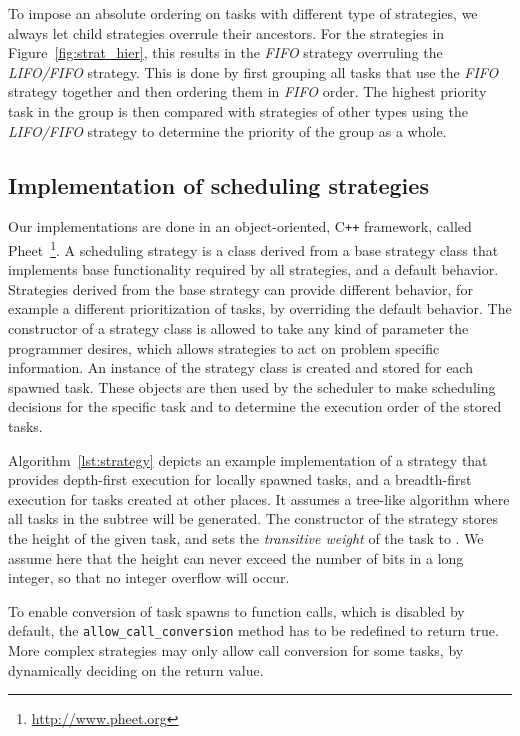 \documentclass[a4paper,11pt]{article}
\begin{document}
To impose an absolute ordering on tasks with different type of
strategies, we always let child strategies overrule their
ancestors. For the strategies in Figure~\ref{fig:strat_hier}, this
results in the \emph{FIFO} strategy overruling the \emph{LIFO/FIFO}
strategy. This is done by first grouping all tasks that use the
\emph{FIFO} strategy together and then ordering them in \emph{FIFO}
order. The highest priority task in the group is then compared with
strategies of other types using the \emph{LIFO/FIFO} strategy to
determine the priority of the group as a whole.

\subsection{Implementation of scheduling strategies}

Our implementations are done in an object-oriented, C\verb!++!
framework, called
Pheet~\cite{mtaap13,ppopp13}\footnote{\url{http://www.pheet.org}}. A
scheduling strategy is a class derived from a base strategy class that
implements base functionality required by all strategies, and a
default behavior. Strategies derived from the base strategy can
provide different behavior, for example a different prioritization of
tasks, by overriding the default behavior. The constructor of a
strategy class is allowed to take any kind of parameter the programmer
desires, which allows strategies to act on problem specific
information.  An instance of the strategy class is created and stored
for each spawned task. These objects are then used by the scheduler to
make scheduling decisions for the specific task and to determine the
execution order of the stored tasks.

Algorithm~\ref{lst:strategy} depicts an example implementation of a
strategy that provides depth-first execution for locally spawned
tasks, and a breadth-first execution for tasks created at other
places. It assumes a tree-like algorithm where all tasks in the
subtree will be generated.  The constructor of the strategy stores the
height  of the given task, and sets the \emph{transitive weight} of
the task to .  We assume here that the height can never exceed
the number of bits in a long integer, so that no integer overflow will
occur.

To enable conversion of task spawns to function calls, which is
disabled by default, the \texttt{allow\_call\_conversion} method has
to be redefined to return true. More complex strategies may only allow
call conversion for some tasks, by dynamically deciding on the return
value.
\end{document}
